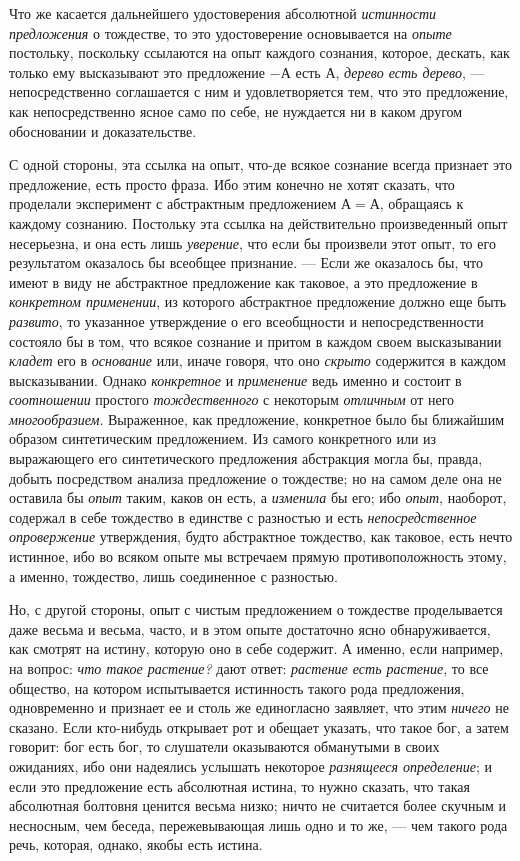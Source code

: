 Что же касается дальнейшего удостоверения абсолютной
{\em истинности предложения} о тождестве, то это
удостоверение основывается на {\em опыте} постольку,
поскольку ссылаются на опыт каждого сознания, которое, дескать, как только
ему высказывают это предложение $-А$ есть $А$,
{\em дерево есть дерево}, — непосредственно соглашается
с ним и удовлетворяется тем, что это предложение, как непосредственно ясное
само по себе, не нуждается ни в каком другом обосновании и доказательстве.

С одной стороны, эта ссылка на опыт, что-де всякое сознание всегда признает
это предложение, есть просто фраза. Ибо этим конечно не хотят сказать, что
проделали эксперимент с абстрактным предложением $А=А$,
обращаясь к каждому сознанию. Постольку эта ссылка на действительно
произведенный опыт несерьезна, и она есть лишь
{\em уверение}, что если бы произвели этот опыт, то его
результатом оказалось бы всеобщее признание. — Если же оказалось бы, что
имеют в виду не абстрактное предложение как таковое, а это предложение в
{\em конкретном применении}, из которого абстрактное
предложение должно еще быть {\em развито}, то указанное
утверждение о его всеобщности и непосредственности состояло бы в том, что
всякое сознание и притом в каждом своем высказывании
{\em кладет} его в {\em основание}
или, иначе говоря, что оно {\em скрыто} содержится в
каждом высказывании. Однако {\em конкретное} и
{\em применение} ведь именно и состоит в
{\em соотношении} простого
{\em тождественного} с некоторым
{\em отличным} от него
{\em многообразием}. Выраженное, как предложение,
конкретное было бы ближайшим образом синтетическим предложением. Из самого
конкретного или из выражающего его синтетического предложения абстракция
могла бы, правда, добыть посредством анализа предложение о тождестве; но на
самом деле она не оставила бы {\em опыт} таким, каков
он есть, а {\em изменила} бы его; ибо
{\em опыт}, наоборот, содержал в себе тождество в
единстве с разностью и есть {\em непосредственное
опровержение} утверждения, будто абстрактное тождество, как таковое, есть
нечто истинное, ибо во всяком опыте мы встречаем прямую противоположность
этому, а именно, тождество, лишь соединенное с разностью.

Но, с другой стороны, опыт с чистым предложением о тождестве проделывается
даже весьма и весьма, часто, и в этом опыте достаточно ясно обнаруживается,
как смотрят на истину, которую оно в себе содержит. А именно, если
например, на вопрос: {\em что такое растение?} дают
ответ: {\em растение есть растение}, то все общество,
на котором испытывается истинность такого рода предложения, одновременно и
признает ее и столь же единогласно заявляет, что этим
{\em ничего} не сказано. Если кто-нибудь открывает рот
и обещает указать, что такое бог, а затем говорит: бог есть бог, то
слушатели оказываются обманутыми в своих ожиданиях, ибо они надеялись
услышать некоторое {\em разнящееся определение}; и если
это предложение есть абсолютная истина, то нужно сказать, что такая
абсолютная болтовня ценится весьма низко; ничто не считается более скучным
и несносным, чем беседа, пережевывающая лишь одно и то же, — чем такого
рода речь, которая, однако, якобы есть истина.


